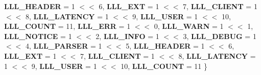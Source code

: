 \begin{DoxyCompactItemize}
{\bfseries L\+L\+L\+\_\+\+H\+E\+A\+D\+ER} = 1 $<$$<$ 6, 
\newline
{\bfseries L\+L\+L\+\_\+\+E\+XT} = 1 $<$$<$ 7, 
{\bfseries L\+L\+L\+\_\+\+C\+L\+I\+E\+NT} = 1 $<$$<$ 8, 
{\bfseries L\+L\+L\+\_\+\+L\+A\+T\+E\+N\+CY} = 1 $<$$<$ 9, 
{\bfseries L\+L\+L\+\_\+\+U\+S\+ER} = 1 $<$$<$ 10, 
\newline
{\bfseries L\+L\+L\+\_\+\+C\+O\+U\+NT} = 11, 
{\bfseries L\+L\+L\+\_\+\+E\+RR} = 1 $<$$<$ 0, 
{\bfseries L\+L\+L\+\_\+\+W\+A\+RN} = 1 $<$$<$ 1, 
{\bfseries L\+L\+L\+\_\+\+N\+O\+T\+I\+CE} = 1 $<$$<$ 2, 
\newline
{\bfseries L\+L\+L\+\_\+\+I\+N\+FO} = 1 $<$$<$ 3, 
{\bfseries L\+L\+L\+\_\+\+D\+E\+B\+UG} = 1 $<$$<$ 4, 
{\bfseries L\+L\+L\+\_\+\+P\+A\+R\+S\+ER} = 1 $<$$<$ 5, 
{\bfseries L\+L\+L\+\_\+\+H\+E\+A\+D\+ER} = 1 $<$$<$ 6, 
\newline
{\bfseries L\+L\+L\+\_\+\+E\+XT} = 1 $<$$<$ 7, 
{\bfseries L\+L\+L\+\_\+\+C\+L\+I\+E\+NT} = 1 $<$$<$ 8, 
{\bfseries L\+L\+L\+\_\+\+L\+A\+T\+E\+N\+CY} = 1 $<$$<$ 9, 
{\bfseries L\+L\+L\+\_\+\+U\+S\+ER} = 1 $<$$<$ 10, 
\newline
{\bfseries L\+L\+L\+\_\+\+C\+O\+U\+NT} = 11
 \}
\end{DoxyCompactItemize}
